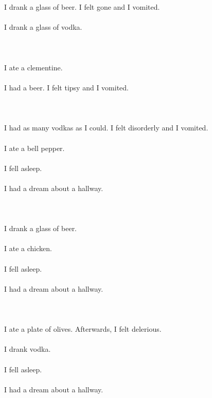 \documentclass{article}
\begin{document}
    \section{}
    I drank a glass of beer. I felt gone and I vomited.\\\\I drank a glass of vodka.\\\\ 
    \newpage
    
    \section{}
    I ate a clementine.\\\\I had a beer. I felt tipsy and I vomited.\\\\ 
    \newpage
    
    \section{}
    I had as many vodkas as I could. I felt disorderly and I vomited.\\\\I ate a bell pepper.\\\\I fell asleep.\\\\I had a dream about a hallway.\\\\ 
    \newpage
    
    \section{}
    I drank a glass of beer.\\\\I ate a chicken.\\\\I fell asleep.\\\\I had a dream about a hallway.\\\\ 
    \newpage
    
    \section{}
    I ate a plate of olives. Afterwards, I felt delerious.\\\\I drank vodka.\\\\I fell asleep.\\\\I had a dream about a hallway.\\\\ 
    \newpage
    
\end{document}
